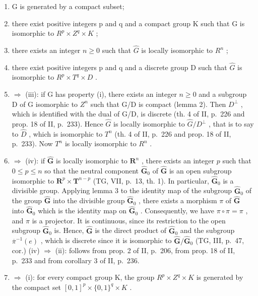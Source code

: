 \begin{enumerate}
\def\labelenumi{(\roman{enumi})}
\item
  G is generated by a compact subset;
\item
  there exist positive integers p and q and a compact group K such that G is isomorphic to \(R^{p} \times Z^{q} \times K\) ;
\item
  there exists an integer \(n \geqslant 0\) such that \(\widehat{G}\) is locally isomorphic to \(R^{n}\) ;
\item
  there exist positive integers p and q and a discrete group D such that \(\widehat{G}\) is isomorphic to \(R^{p} \times T^{q} \times D\) .
\item
  \(\Longrightarrow\) (iii): if G has property (i), there exists an integer \(n \geqslant 0\) and a subgroup D of G isomorphic to \(Z^{n}\) such that G/D is compact (lemma 2). Then \(D^{\perp}\) , which is identified with the dual of G/D, is discrete (th. 4 of II, p.~226 and prop. 18 of II, p.~233). Hence \(\widehat{G}\) is locally isomorphic to \(\widehat{G}/D^{\perp}\) , that is to say to \(\widehat{D}\) , which is isomorphic to \(T^{n}\) (th. 4 of II, p.~226 and prop. 18 of II, p.~233). Now \(T^{n}\) is locally isomorphic to \(R^{n}\) .
\item
  \(\Longrightarrow\) (iv): if \(\widehat{\mathbf{G}}\) is locally isomorphic to \(\mathbf{R}^n\) , there exists an integer \(p\) such that \(0 \leqslant p \leqslant n\) so that the neutral component \(\widehat{\mathbf{G}}_0\) of \(\widehat{\mathbf{G}}\) is an open subgroup isomorphic to \(\mathbf{R}^p \times \mathbf{T}^{n-p}\) (TG, VII, p.~13, th. 1). In particular, \(\widehat{\mathbf{G}}_0\) is a divisible group. Applying lemma 3 to the identity map of the subgroup \(\widehat{\mathbf{G}}_0\) of the group \(\widehat{\mathbf{G}}\) into the divisible group \(\widehat{\mathbf{G}}_0\) , there exists a morphism \(\pi\) of \(\widehat{\mathbf{G}}\) into \(\widehat{\mathbf{G}}_0\) which is the identity map on \(\widehat{\mathbf{G}}_0\) . Consequently, we have \(\pi \circ \pi = \pi\) , and \(\pi\) is a projector. It is continuous, since its restriction to the open subgroup \(\widehat{\mathbf{G}}_0\) is. Hence, \(\widehat{\mathbf{G}}\) is the direct product of \(\widehat{\mathbf{G}}_0\) and the subgroup \(\overline{\pi}^{-1}(e)\) , which is discrete since it is isomorphic to \(\widehat{\mathbf{G}} / \widehat{\mathbf{G}}_0\) (TG, III, p.~47, cor.) (iv) \(\Longrightarrow\) (ii): follows from prop. 2 of II, p.~206, from prop. 18 of II, p.~233 and from corollary 3 of II, p.~236.
\item
  \(\Longrightarrow\) (i): for every compact group K, the group \(R^{p} \times Z^{q} \times K\) is generated by the compact set \([0,1]^{p} \times \{0,1\}^{q} \times K\) .
\end{enumerate}

